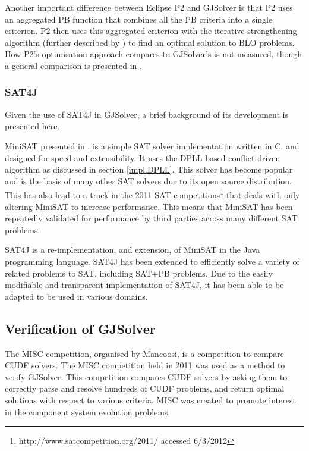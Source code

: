 Another important difference between Eclipse P2 and GJSolver is that P2 uses an aggregated PB function \citep{marque2011blex} that combines all the PB criteria into a single criterion.
P2 then uses this aggregated criterion with the iterative-strengthening algorithm (further described by \cite{leBerre2010}) to find an optimal solution to BLO problems.  
How P2's optimisation approach compares to GJSolver's is not measured, though a general comparison is presented in \cite{marque2011blex}.

\subsubsection{SAT4J}
Given the use of SAT4J in GJSolver, a brief background of its development is presented here.

MiniSAT presented in \citep{een2003}, is a simple SAT solver implementation written in C, and designed for speed and extensibility.
It uses the DPLL based conflict driven algorithm as discussed in section \ref{impl.DPLL}.
This solver has become popular and is the basis of many other SAT solvers due to its open source distribution.
This has also lead to a track in the 2011 SAT competitions\footnote{http://www.satcompetition.org/2011/ accessed 6/3/2012} that deals with only altering MiniSAT to increase performance.
This means that MiniSAT has been repeatedly validated for performance by third parties across many different SAT problems. 

SAT4J \citep{le2010sat4j} is a re-implementation, and extension, of MiniSAT in the Java programming language.
SAT4J has been extended to efficiently solve a variety of related problems to SAT, including SAT+PB problems.
Due to the easily modifiable and transparent implementation of SAT4J, it has been able to be adapted to be used in various domains.

\subsection{Verification of GJSolver}
\label{impl.verif}
The MISC competition, organised by Mancoosi, is a competition to compare CUDF solvers.
The MISC competition held in 2011 was used as a method to verify GJSolver.
This competition compares CUDF solvers by asking them to correctly parse and resolve hundreds of CUDF problems, and return optimal solutions with respect to various criteria.
MISC was created to promote interest in the component system evolution problems.


